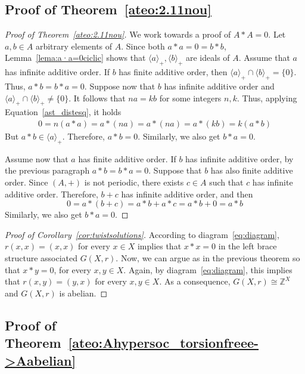 \documentclass[12pt, a4paper, english]{article}
\theoremstyle{definition}
\begin{document}
\subsection{Proof of Theorem~\ref{ateo:2.11nou}}
\label{subsec:proof1}

\begin{proof}[Proof of Theorem~\ref{ateo:2.11nou}]
We work towards a proof of $A \ast A = 0$. Let $a , b \in A$ arbitrary elements of $A$.  Since both $a \ast a = 0 = b \ast b$, Lemma~\ref{lema:a·a=0ciclic} shows that $\langle a \rangle_+, \langle b \rangle_+$ are  ideals of $A$. Assume that $a$ has infinite additive order. If $b$ has finite additive order, then $\langle a \rangle_+ \cap \langle b \rangle_+ = \{0\}$. Thus, $a \ast b = b \ast a  = 0$. Suppose now that $b$ has infinite additive order and $\langle a \rangle_+ \cap \langle b \rangle_+ \neq \{0\}$. It follows that $na = kb$ for some integers $n,k$. Thus, applying Equation~\eqref{ast_distesq}, it holds
\begin{align*}
0 = n(a \ast a) = a \ast (na) = a \ast (na) = a \ast (kb) = k(a \ast b)
\end{align*}
But $a \ast b \in \langle a \rangle_+$. Therefore, $a \ast b = 0$. Similarly, we also get $b \ast a = 0$.

Assume now that $a$ has finite additive order. If $b$ has infinite additive order, by the previous paragraph $a \ast b = b \ast a = 0$. Suppose that $b$ has also finite additive order. Since $(A,+)$ is not periodic, there exists $c\in A$ such that $c$ has infinite additive order. Therefore, $b+c$ has infinite additive order, and then
\[ 0 = a \ast (b+c) = a \ast b + a \ast c = a \ast b + 0 = a \ast b\]
Similarly, we also get $b\ast a = 0$. 
\end{proof}

\begin{proof}[Proof of Corollary~\ref{cor:twistsolutions}]
According to diagram~\eqref{eq:diagram}, $r(x,x) = (x,x)$ for every $x\in X$ implies that $x \ast x = 0$ in the left brace structure associated $G(X,r)$. Now, we can argue as in the previous theorem so that $x\ast y = 0$, for every $x, y \in X$. Again, by diagram~\eqref{eq:diagram}, this implies that $r(x,y) = (y,x)$ for every $x,y\in X$. As a consequence, $G(X,r)\cong \mathbb{Z}^X$ and $G(X,r)$ is abelian.
\end{proof}



\subsection{Proof of Theorem~\ref{ateo:Ahypersoc_torsionfreee->Aabelian}}
\end{document}
